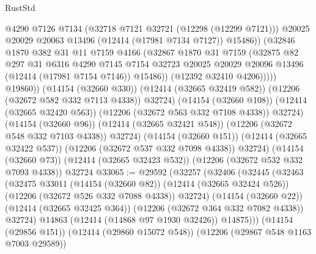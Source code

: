 \begin{lexlean}{RustStd}
\begin{coremodule}
{\begin{coremodule}
{{{{{{{{{{{{{{{{{{{{{{{{{{{{{{{{{{{{{{{{{{{{{{{{{{                          @4290
                          @7126
                          @7134
                          (@32718 @7121 @32721 (@12298 (@12299 @7121)))
                          @20025
                          @20029
                          @20063
                          @13496
                          (@12414 (@17981 @7134 @7127))
                          @15486))
                      (@32846
                        @1870
                        @382
                        @31
                        @11
                        @7159
                        @4166
                        (@32867
                          @1870
                          @31
                          @7159
                          (@32875
                            @82
                            @297
                            @31
                            @6316
                            @4290
                            @7145
                            @7154
                            @32723
                            @20025
                            @20029
                            @20096
                            @13496
                            (@12414 (@17981 @7154 @7146))
                            @15486))
                        (@12392 @32410 @4206)))))
                @19860))
            (@14154 (@32660 @330))
            (@12414 (@32665 @32419 @582))
            (@12206 (@32672 @582 @332 @7113 @4338))
            @32724)
          (@14154 (@32660 @108))
          (@12414 (@32665 @32420 @563))
          (@12206 (@32672 @563 @332 @7108 @4338))
          @32724)
        (@14154 (@32660 @96))
        (@12414 (@32665 @32421 @548))
        (@12206 (@32672 @548 @332 @7103 @4338))
        @32724)
      (@14154 (@32660 @151))
      (@12414 (@32665 @32422 @537))
      (@12206 (@32672 @537 @332 @7098 @4338))
      @32724)
    (@14154 (@32660 @73))
    (@12414 (@32665 @32423 @532))
    (@12206 (@32672 @532 @332 @7093 @4338))
    @32724
@33065 := @29592
    (@32257
      (@32406
        (@32445
          (@32463
            (@32475
              @33011
              (@14154 (@32660 @82))
              (@12414 (@32665 @32424 @526))
              (@12206 (@32672 @526 @332 @7088 @4338))
              @32724)
            (@14154 (@32660 @22))
            (@12414 (@32665 @32425 @364))
            (@12206 (@32672 @364 @332 @7082 @4338))
            @32724)
          @14863
          (@12414 (@14868 @97 @1930 @32426))
          @14875)))
    (@14154 (@29856 @151))
    (@12414 (@29860 @15072 @548))
    (@12206 (@29867 @548 @1163 @7003 @29589))
}}}}}}}}}}}}}}}}}}}}}}}}}}}}}}}}}}}}}}}}}}}}}}}}}}
\end{coremodule}}
\end{coremodule}
\end{lexlean}
